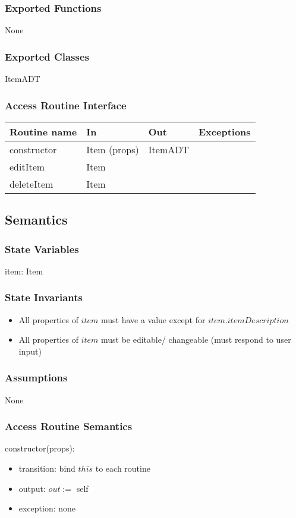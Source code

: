\documentclass[12pt]{article}
\begin{document}
\subsubsection{Exported Functions}
None

\subsubsection{Exported Classes}
ItemADT

\subsubsection{Access Routine Interface}
\begin{tabular}{| l | l | l | p{5cm} |}
  \hline
  \textbf{Routine name} & \textbf{In} & \textbf{Out} & \textbf{Exceptions}\\
  \hline
  constructor & Item (props) & ItemADT & ~\\
  \hline
  editItem & Item & ~ & ~\\
  \hline 
  deleteItem & Item & ~ & ~\\
  \hline
  \end{tabular}

\bigskip
\subsection{Semantics}
\subsubsection{State Variables}
item: Item

\subsubsection{State Invariants}
\begin{itemize}
  \item All properties of $item$ must have a value except for $item.itemDescription$
  \item All properties of $item$ must be editable/ changeable (must respond to user input)
\end{itemize}

\subsubsection{Assumptions}
None

\subsubsection{Access Routine Semantics}
constructor(props):
\begin{itemize}
  \item transition: bind $this$ to each routine
  \item output: $out :=$ self
  \item exception: none
\end{itemize}
\end{document}
